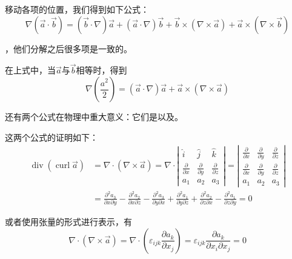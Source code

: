 \documentclass{ctexart}
\begin{document}
\par 
移动各项的位置，我们得到如下公式：
$$
   \nabla (\vec{a} \cdot \vec{b})=(\vec{b} \cdot \nabla )\vec{a} + (\vec{a} \cdot \nabla) \vec{b} + \vec{b} \times (\nabla \times \vec{a}) + \vec{a} \times (\nabla \times \vec{b})
$$
\par
{}，他们分解之后很多项是一致的。
\par
在上式中，当$\vec{a}$与$\vec{b}$相等时，得到
$$
 \nabla (\frac{a^2}{2}) = (\vec{a} \cdot \nabla)\vec{a} + \vec{a} \times (\nabla \times \vec{a})
$$
\par
还有两个公式在物理中重大意义：它们是以及。
\par
这两个公式的证明如下：
$$
\begin{aligned}
\operatorname{div}(\operatorname{curl} \vec{a}) &=\nabla \cdot(\nabla \times \vec{a}) =\nabla \cdot\left|\begin{array}{ccc}
\hat{i} & \hat{j} & \hat{k} \\
\frac{\partial}{\partial x} & \frac{\partial}{\partial y} & \frac{\partial}{\partial z} \\
a_{1} & a_{2} & a_{3}
\end{array}\right| =\left|\begin{array}{lll}
\frac{\partial}{\partial x} & \frac{\partial}{\partial y} & \frac{\partial}{\partial z} \\
\frac{\partial}{\partial x} & \frac{\partial}{\partial y} & \frac{\partial}{\partial z} \\
a_{1} & a_{2} & a_{3}
\end{array}\right| \\
&=\frac{\partial^{2} a_{3}}{\partial x \partial y}-\frac{\partial^{2} a_{2}}{\partial x \partial z}-\frac{\partial^{2} a_{3}}{\partial y \partial x}+\frac{\partial^{2} a_{1}}{\partial y \partial z}+\frac{\partial^{2} a_{2}}{\partial z \partial x}-\frac{\partial^{2} a_{1}}{\partial z \partial y} =0
\end{aligned}
$$
\par
或者使用张量的形式进行表示，有
$$
  \nabla \cdot(\nabla \times \vec{a}) = \nabla \cdot(\varepsilon_{i j k} \frac{ \partial a_{k} }{ \partial x_{j}}) = \varepsilon_{i j k} \frac{ \partial a_{k} }{ \partial x_{i} \partial x_{j}} =0
$$
\end{document}
